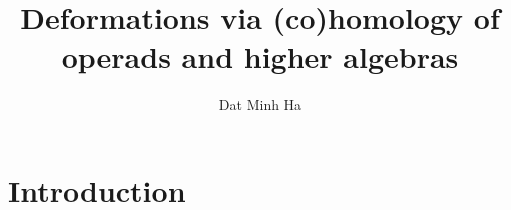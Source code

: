 

\setcounter{section}{-1}





    \title{Deformations via (co)homology of operads and higher algebras}
    
    \author{Dat Minh Ha}
    \maketitle
    
    \begin{abstract}
        
    \end{abstract}
    
    {
      \hypersetup{} 
      \tableofcontents %
    }

    \section{Introduction}

    

    
    
    \printbibliography

